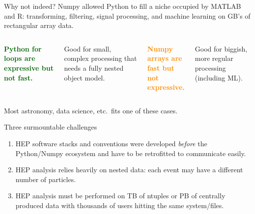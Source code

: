 \documentclass[aspectratio=169]{beamer}
\begin{document}
\begin{frame}{Why not indeed?}
\vspace{0.5 cm}
Numpy allowed Python to fill a niche occupied by MATLAB and R: transforming, filtering, signal processing, and machine learning on GB's of rectangular array data.

\vspace{0.75 cm}
\begin{columns}[t]

\textcolor{darkgreen}{\bf Python for loops are expressive but not fast.}

\vspace{0.25 cm}
Good for small, complex processing that needs a fully nested object model.

\textcolor{darkorange}{\bf Numpy arrays are \\ fast but not expressive.}

\vspace{0.25 cm}
Good for biggish, more regular processing (including ML).

\end{columns}

\vspace{0.75 cm}
Most astronomy, data science, etc.\ fits one of these cases.
\end{frame}

\begin{frame}{Three surmountable challenges}
\large
\vspace{0.5 cm}
\begin{center}
\begin{minipage}{0.75\linewidth}
\begin{enumerate}\setlength{\itemsep}{1 cm}
\item HEP software stacks and conventions were developed {\it before} the Python/Numpy ecosystem and have to be retrofitted to communicate easily.

\item HEP analysis relies heavily on nested data: each event may have a different number of particles.

\item HEP analysis must be performed on TB of ntuples or PB of centrally produced data with thousands of users hitting the same system/files.
\end{enumerate}
\end{minipage}\mbox{\hspace{1 cm}}
\end{center}
\end{frame}
\end{document}

